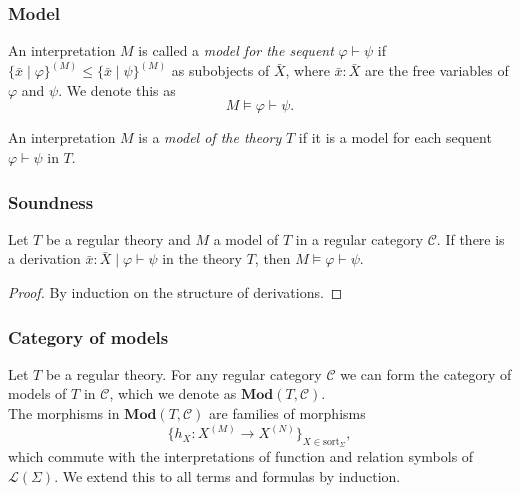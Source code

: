 \documentclass[14pt]{beamer}
\theoremstyle{plain}
\begin{document}
  \begin{frame}
    \frametitle{Model}
    \begin{definition}
      An interpretation $M$ is called a \emph{model for the sequent}
      $\varphi \vdash \psi$ 
      \pause
      if 
      $\{ \bar{x} \mid \varphi \}^{(M)} \leq \{\bar{x} \mid \psi \}^{(M)}$
      as subobjects of $\bar{X}$, \pause
      where $\bar{x} : \bar{X}$ are the free variables
      of $\varphi$ and $\psi$. \pause
      We denote this as
      \[ M \models \varphi \vdash \psi. \]
    \end{definition}
    \pause
    \begin{definition}
      An interpretation $M$ is a \emph{model of the theory} $T$ if it is a model
      for each sequent $\varphi \vdash \psi$ in $T$.
    \end{definition}
  \end{frame}

  \begin{frame}
    \frametitle{Soundness}
    \begin{theorem}
      Let $T$ be a regular theory and $M$ a model of $T$ in a regular category
      $\mathcal{C}$. \pause
      If there is a derivation
      $\bar{x} : \bar{X} \mid \varphi \vdash \psi$ in the theory $T$, then
      $M \models \varphi \vdash \psi$.
    \end{theorem}
    \pause
    \begin{proof}
      By induction on the structure of derivations.
    \end{proof}
  \end{frame}

  \begin{frame}
    \frametitle{Category of models}
    Let $T$ be a regular theory. \pause For any regular category $\mathcal{C}$ we can form
    the category of models of $T$ in $\mathcal{C}$, which we denote as
    $\mathbf{Mod}(T, \mathcal{C})$.
    \pause \\
    The morphisms in $\mathbf{Mod}(T, \mathcal{C})$ are families of morphisms
    $$\{h_X : X^{(M)} \to X^{(N)} \}_{X \in \mathrm{sort}_{\Sigma}},$$
    \pause
    which commute with the interpretations of function and relation symbols of
    $\mathcal{L}(\Sigma)$. \pause We extend this to all terms and formulas by induction.

  \end{frame}
\end{document}
